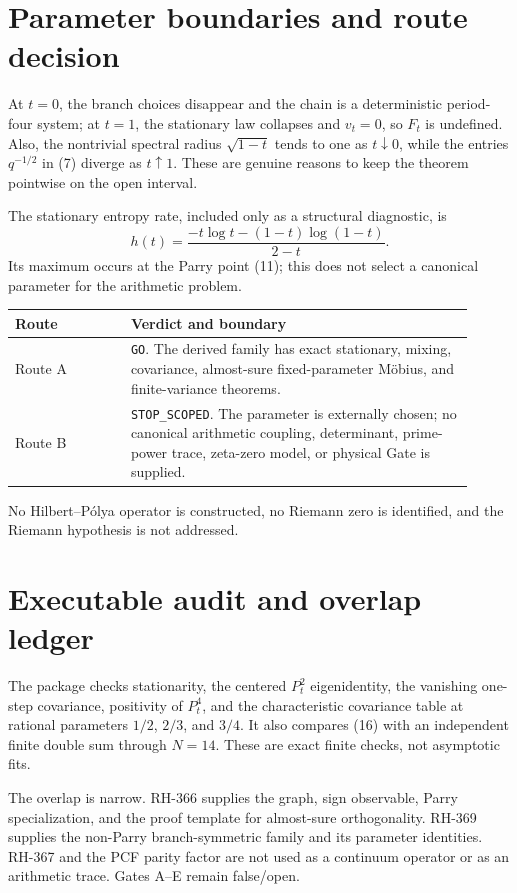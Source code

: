 \documentclass[11pt]{article}
\begin{document}
\section{Parameter boundaries and route decision}

At $t=0$, the branch choices disappear and the chain is a deterministic
period-four system; at $t=1$, the stationary law collapses and $v_t=0$, so
$F_t$ is undefined.  Also, the nontrivial spectral radius
$\sqrt{1-t}$ tends to one as $t\downarrow0$, while the entries
$q^{-1/2}$ in (7) diverge as $t\uparrow1$.  These are genuine reasons to keep
the theorem pointwise on the open interval.

The stationary entropy rate, included only as a structural diagnostic, is
\[
 h(t)=\frac{-t\log t-(1-t)\log(1-t)}{2-t}. \tag{21}
\]
Its maximum occurs at the Parry point (11); this does not select a canonical
parameter for the arithmetic problem.

\begin{center}
\begin{tabular}{p{0.23\linewidth}p{0.68\linewidth}}
\toprule
Route & Verdict and boundary\\
\midrule
Route A & \texttt{GO}.  The derived family has exact stationary, mixing,
covariance, almost-sure fixed-parameter Möbius, and finite-variance theorems.\\
Route B & \texttt{STOP\_SCOPED}.  The parameter is externally chosen; no
canonical arithmetic coupling, determinant, prime-power trace, zeta-zero
model, or physical Gate is supplied.\\
\bottomrule
\end{tabular}
\end{center}

No Hilbert--Pólya operator is constructed, no Riemann zero is identified, and
the Riemann hypothesis is not addressed.

\section{Executable audit and overlap ledger}

The package checks stationarity, the centered $P_t^2$ eigenidentity, the
vanishing one-step covariance, positivity of $P_t^4$, and the characteristic
covariance table at rational parameters $1/2$, $2/3$, and $3/4$.  It also
compares (16) with an independent finite double sum through $N=14$.
These are exact finite checks, not asymptotic fits.

The overlap is narrow.  RH-366 supplies the graph, sign observable, Parry
specialization, and the proof template for almost-sure orthogonality.
RH-369 supplies the non-Parry branch-symmetric family and its parameter
identities.  RH-367 and the PCF parity factor are not used as a continuum
operator or as an arithmetic trace.  Gates A--E remain false/open.
\end{document}
